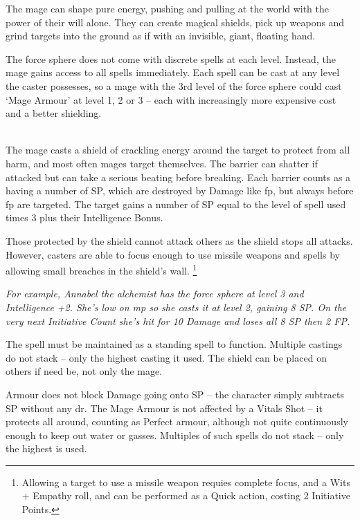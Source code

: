 \documentclass[titlepage,a4paper,openany]{book}
\begin{document}
\begin{multicols}{2}

The mage can shape pure energy, pushing and pulling at the world with the power of their will alone. They can create magical shields, pick up weapons and grind targets into the ground as if with an invisible, giant, floating hand.

The force sphere does not come with discrete spells at each level. Instead, the mage gains access to all spells immediately. Each spell can be cast at any level the caster possesses, so a mage with the 3rd level of the force sphere could cast `Mage Armour' at level 1, 2 or 3 -- each with increasingly more expensive cost and a better shielding.

\\
The mage casts a shield of crackling energy around the target to protect from all harm, and most often mages target themselves.  The barrier can shatter if attacked but can take a serious beating before breaking. Each barrier counts as a having a number of \gls{SP}, which are destroyed by Damage like \gls{fp}, but always before \gls{fp} are targeted.
The target gains a number of \gls{SP} equal to the level of spell used times 3 plus their Intelligence Bonus.

Those protected by the shield cannot attack others as the shield stops all attacks.
However, casters are able to focus enough to use missile weapons and spells by allowing small breaches in the shield's wall.
\footnote{Allowing a target to use a missile weapon requies complete focus, and a Wits + Empathy roll, and can be performed as a Quick action, costing 2 Initiative Points.}

\textit{For example, Annabel the alchemist has the force sphere at level 3 and Intelligence +2. She's low on \gls{mp} so she casts it at level 2, gaining 8 \gls{SP}. On the very next Initiative Count she's hit for 10 Damage and loses all 8 \gls{SP} then 2 FP.}

The spell must be maintained as a standing spell to function. Multiple castings do not stack -- only the highest casting it used. The shield can be placed on others if need be, not only the mage.

Armour does not block Damage going onto \gls{SP} -- the character simply subtracts \gls{SP} without any \gls{dr}. The Mage Armour is not affected by a Vitals Shot -- it protects all around, counting as Perfect armour, although not quite continuously enough to keep out water or gasses. Multiples of such spells do not stack -- only the highest is used.


\end{multicols}
\end{document}
